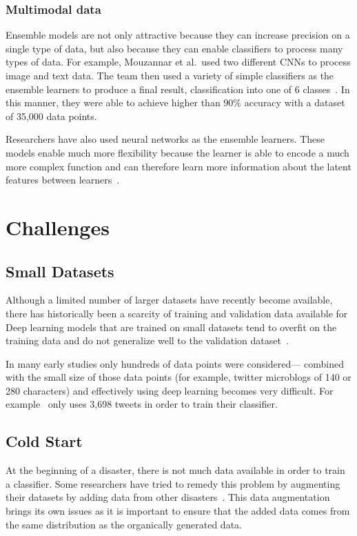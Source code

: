   
  \subsubsection{Multimodal data} 
  Ensemble models are not only attractive because they can increase precision on a
  single type of data, but also because they can enable classifiers to process
  many types of data. For example, Mouzannar et al.\ used two different CNNs to 
  process image and text data. The team then used a variety of simple classifiers 
  as the ensemble learners to produce a final result,
  classification into one of 6 classes~\cite{mouzannarDamageIdentificationSocial2018}.
  In this manner, they were able to achieve higher than 90\% accuracy with a dataset of 
  35,000 data points.

  Researchers have also used neural networks as the ensemble learners. These models enable
  much more flexibility because the learner is able to encode a much more complex
  function and can therefore learn more information about the
  latent features between learners~\cite{jordanHierarchicalMixturesExperts1994}.

\section{Challenges}

\subsection{Small Datasets}
Although a limited number of larger datasets have recently become available, there has
historically been a scarcity of training and validation data available for
Deep learning models that are trained on small datasets tend to overfit on the
training data and do not generalize well to the validation
dataset~\cite{perezEffectivenessDataAugmentation2017,nguyenRapidClassificationCrisisRelated}.

In many early studies only hundreds of data points were considered--- combined
with the small size of those data points (for example, twitter microblogs of
140 or 280 characters) and effectively using deep learning becomes very
difficult. For example~\cite{nagyCrowdSentimentDetection2012} only uses 3,698 tweets in
order to train their classifier.

\subsection{Cold Start}
At the beginning of a disaster, there is not much data available in order to
train a classifier. Some researchers have tried to remedy this problem by
augmenting their datasets by adding data from other
disasters~\cite{perezEffectivenessDataAugmentation2017}. This data augmentation
brings its own issues as it is important to ensure that the added data comes
from the same distribution as the organically generated data.

